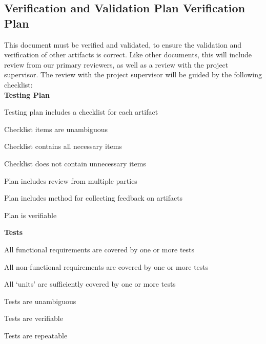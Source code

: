 \documentclass[12pt, titlepage]{article}
\begin{document}


\subsection{Verification and Validation Plan Verification Plan}
This document must be verified and validated, to ensure the validation and verification of other artifacts is correct. Like other documents, this will include review
from our primary reviewers, as well as a review with the project supervisor. The review with the project supervisor will be guided by the following checklist:\\

\textbf{Testing Plan}\\
\begin{todolist}
  \item Testing plan includes a checklist for each artifact
  \item Checklist items are unambiguous
  \item Checklist contains all necessary items
  \item Checklist does not contain unnecessary items
  \item Plan includes review from multiple parties
  \item Plan includes method for collecting feedback on artifacts
  \item Plan is verifiable
  \end{todolist}
\textbf{Tests}\\
\begin{todolist}
  \item All functional requirements are covered by one or more tests\\
  \item All non-functional requirements are covered by one or more tests\\
  \item All `units' are sufficiently covered by one or more tests\\
  \item Tests are unambiguous
  \item Tests are verifiable
  \item Tests are repeatable
  \end{todolist}

\end{document}
